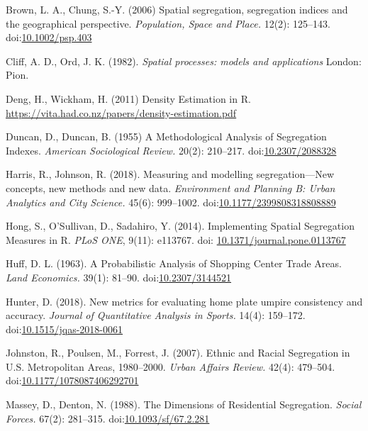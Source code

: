 \documentclass{article}
\theoremstyle{theorem}
\theoremstyle{definition}
\begin{document}
\begin{thebibliography}{3}

Brown, L. A., Chung, S.-Y. (2006) Spatial segregation, segregation indices and the geographical perspective. \textit{Population, Space and Place.} 12(2): 125--143. doi:\href{https://doi.org/10.1002/psp.403}{10.1002/psp.403}

Cliff, A. D., Ord, J. K. (1982). \textit{Spatial processes: models and applications} London: Pion.

 Deng, H., Wickham, H. (2011) Density Estimation in R. \href{https://vita.had.co.nz/papers/density-estimation.pdf}{\url{https://vita.had.co.nz/papers/density-estimation.pdf}}

 Duncan, D., Duncan, B. (1955) A Methodological Analysis of Segregation Indexes. \textit{American Sociological Review.} 20(2): 210--217. doi:\href{http://dx.doi.org/10.2307/2088328}{10.2307/2088328}

Harris, R., Johnson, R. (2018). Measuring and modelling segregation---New concepts, new methods and new data. \textit{Environment and Planning B: Urban Analytics and City Science.} 45(6): 999--1002. doi:\href{http://dx.doi.org/10.1177/2399808318808889}{10.1177/2399808318808889}

 Hong, S., O'Sullivan, D., Sadahiro, Y. (2014). Implementing Spatial Segregation Measures in R. \textit{PLoS ONE}, 9(11): e113767. doi: \href{http://dx.doi.org/10.1371/journal.pone.0113767}{10.1371/journal.pone.0113767}

 Huff, D. L. (1963). A Probabilistic Analysis of Shopping Center Trade Areas. \textit{Land Economics.} 39(1): 81--90. doi:\href{https://doi.org/10.2307/3144521}{10.2307/3144521}

 Hunter, D. (2018). New metrics for evaluating home plate umpire consistency and accuracy. \textit{Journal of Quantitative Analysis in Sports.} 14(4): 159--172. doi:\href{http://dx.doi.org/10.1515/jqas-2018-0061}{10.1515/jqas-2018-0061}

Johnston, R., Poulsen, M., Forrest, J. (2007). Ethnic and Racial Segregation in U.S. Metropolitan Areas, 1980--2000. \textit{Urban Affairs Review.} 42(4): 479--504. doi:\href{https://doi.org/10.1177/1078087406292701}{10.1177/1078087406292701}

 Massey, D., Denton, N. (1988). The Dimensions of Residential Segregation. \textit{Social Forces.} 67(2): 281--315. doi:\href{http://dx.doi.org/10.1093/sf/67.2.281}{10.1093/sf/67.2.281}


\end{thebibliography}
\end{document}
